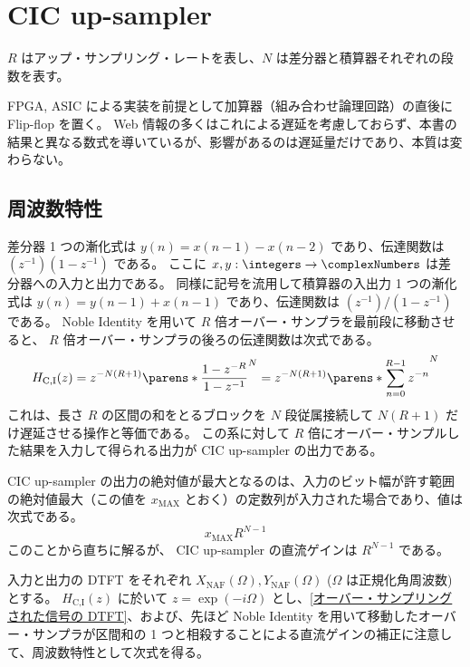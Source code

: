 \section{CIC up-sampler}
    \label{CIC up-sampler}
    \newcommand{\XNAF}{X_\text{NAF}}
    \newcommand{\YNAF}{Y_\text{NAF}}
    \newcommand{\tYNAF}{\tilde{Y}_\text{NAF}}
    \newcommand{\XNF}{X_\text{NF}}
    \newcommand{\YNF}{Y_\text{NF}}
    \newcommand{\tYNF}{\tilde{Y}_\text{NF}}

    $R$ はアップ・サンプリング・レートを表し、$N$ は差分器と積算器それぞれの段数を表す。
    \par
    FPGA, ASIC による実装を前提として加算器（組み合わせ論理回路）の直後に Flip-flop を置く。
    Web 情報の多くはこれによる遅延を考慮しておらず、本書の結果と異なる数式を導いているが、影響があるのは遅延量だけであり、本質は変わらない。
    \subsection{周波数特性}
        \label{CIC up-sampler の周波数特性}
        差分器 1 つの漸化式は $y(n) = x(n-1) - x(n-2)$ であり、伝達関数は $(z^{-1})(1-z^{-1})$ である。
        ここに $x,y:\integers\to\complexNumbers$ は差分器への入力と出力である。
        同様に記号を流用して積算器の入出力 1 つの漸化式は $y(n) = y(n-1) + x(n-1)$ であり、伝達関数は $(z^{-1})/(1-z^{-1})$ である。
        Noble Identity を用いて $R$ 倍オーバー・サンプラを最前段に移動させると、 $R$ 倍オーバー・サンプラの後ろの伝達関数は次式である。
        \[ H_\text{C,I}(z) = z^{-N(R+1)}\parens*{\frac{1-z^{-R}}{1-z^{-1}}}^N = z^{-N(R+1)}\parens*{\sum_{n=0}^{R-1} z^{-n}}^N \]
        これは、長さ $R$ の区間の和をとるブロックを $N$ 段従属接続して $N(R+1)$ だけ遅延させる操作と等価である。
        この系に対して $R$ 倍にオーバー・サンプルした結果を入力して得られる出力が CIC up-sampler の出力である。
        \par
        CIC up-sampler の出力の絶対値が最大となるのは、入力のビット幅が許す範囲の絶対値最大（この値を $x_\text{MAX}$ とおく）の定数列が入力された場合であり、値は次式である。
        \begin{equation}
            x_\text{MAX}R^{N-1}
            \label{equation:CIC up-sampler の出力の絶対値の最大値}
        \end{equation}
        このことから直ちに解るが、 CIC up-sampler の直流ゲインは $R^{N-1}$ である。
        \par
        入力と出力の DTFT をそれぞれ $\XNAF(\Omega), \YNAF(\Omega)$ ($\Omega$ は正規化角周波数) とする。
        $H_\text{C,I}(z)$ に於いて $z = \exp(-i\Omega)$ とし、\ref{オーバー・サンプリングされた信号の DTFT}、および、先ほど Noble Identity を用いて移動したオーバー・サンプラが区間和の 1 つと相殺することによる直流ゲインの補正に注意して、周波数特性として次式を得る。
